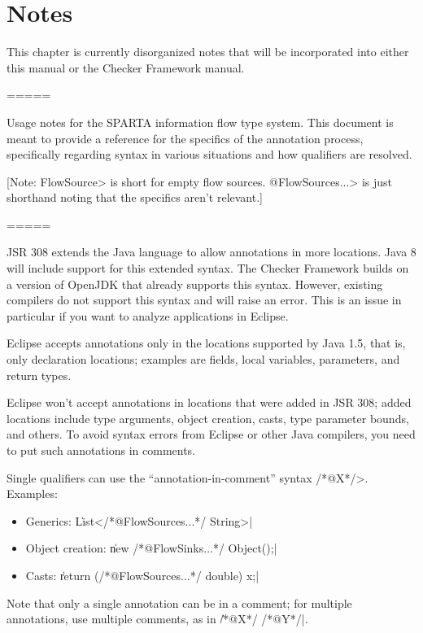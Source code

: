 \htmlhr
\chapter{Notes\label{notes}}

This chapter is currently disorganized notes that will be incorporated into
either this manual or the Checker Framework manual.

=====

Usage notes for the SPARTA information flow type system. This document
is meant to provide a reference for the specifics of the annotation
process, specifically regarding syntax in various situations and how
qualifiers are resolved.

[Note: \<FlowSource{}> is short for empty flow sources. \<@FlowSources...> is
just shorthand noting that the specifics aren't relevant.]

=====

JSR 308 extends the Java language to allow annotations in more
locations. Java 8 will include support for this extended syntax.
The Checker Framework builds on a version of OpenJDK that already
supports this syntax.
However, existing compilers do not support this syntax and will raise
an error. This is an issue in particular if you want to analyze
applications in Eclipse.

Eclipse accepts annotations only in the locations supported by Java
1.5, that is, only declaration locations; examples are fields, local
variables, parameters, and return types.

Eclipse won't accept annotations in locations that were added in
JSR 308; added locations include type arguments, object creation,
casts, type parameter bounds, and others.
To avoid syntax errors from Eclipse or other Java compilers, you need
to put such annotations in comments.

Single qualifiers can use the ``annotation-in-comment'' syntax
\</*@X*/>. Examples:

\begin{itemize}
\item Generics:
	\|List</*@FlowSources...*/ String>|

\item Object creation:
	\|new /*@FlowSinks...*/ Object();|

\item Casts:
	\|return (/*@FlowSources...*/ double) x;|
\end{itemize}

Note that only a single annotation can be in a comment; for
multiple annotations, use multiple comments, as in \|/*@X*/ /*@Y*/|.

